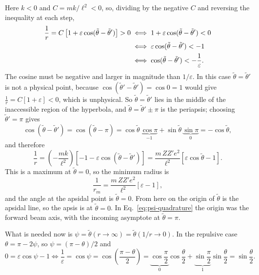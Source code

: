 \documentclass[11pt]{article}
\newcommand{\orbang}{\tilde\theta}
\begin{document}
Here $k<0$ and $C = mk/\ell^{2} < 0$, so, dividing by the negative $C$ and
reversing the inequality at each step,
%
\begin{align}
  \frac{1}{r} = C\left[1 + \varepsilon\cos(\orbang-\orbang')\right] > 0
  &\iff 1 + \varepsilon\cos(\orbang-\orbang') < 0 \notag\\
  &\iff \varepsilon\cos(\orbang-\orbang') < -1 \notag\\
  &\iff \cos(\orbang-\orbang') < -\frac{1}{\varepsilon} .
  \label{eq:repulsive-ineq}
\end{align}
%
The cosine must be negative and larger in magnitude than $1/\varepsilon$. In
this case $\orbang = \orbang'$ is not a physical point, because
$\cos(\orbang'-\orbang') = \cos 0 = 1$ would give
$\frac{1}{r} = C\left[1+\varepsilon\right] < 0$, which is unphysical. So
$\orbang = \orbang'$ lies in the middle of the inaccessible region of the
hyperbola, and $\orbang = \orbang' \pm \pi$ is the periapsis; choosing
$\orbang' = \pi$ gives
%
\begin{equation}\label{eq:cos-shift}
  \cos(\orbang-\orbang') = \cos(\orbang-\pi)
    = \cos\orbang\,\underbrace{\cos\pi}_{-1}
    + \sin\orbang\,\underbrace{\sin\pi}_{0}
    = -\cos\orbang ,
\end{equation}
%
and therefore
%
\begin{equation}\label{eq:repulsive-orbit}
  \frac{1}{r} = \left(-\frac{mk}{\ell^{2}}\right)
                \left[-1 - \varepsilon\cos(\orbang-\orbang')\right]
              = \frac{m\,Z Z' e^{2}}{\ell^{2}}\left[\varepsilon\cos\orbang - 1\right].
\end{equation}
%
This is a maximum at $\orbang = 0$, so the minimum radius is
%
\begin{equation}\label{eq:rmin-repulsive}
  \frac{1}{r_m} = \frac{m\,Z Z' e^{2}}{\ell^{2}}\left[\varepsilon - 1\right],
\end{equation}
%
and the angle at the apsidal point is $\orbang = 0$. From here on the origin of
$\orbang$ is the apsidal line, so the apsis is at $\orbang = 0$. In
Eq.~\eqref{eq:psi-quadrature} the origin was the forward beam axis, with the
incoming asymptote at $\orbang = \pi$.

What is needed now is $\psi = \orbang(r\to\infty) = \orbang(1/r \to 0)$. In the
repulsive case $\theta = \pi - 2\psi$, so $\psi = (\pi-\theta)/2$ and
%
\begin{equation}\label{eq:psi-repulsive}
  0 = \varepsilon\cos\psi - 1
  \iff
  \frac{1}{\varepsilon} = \cos\psi = \cos\!\left(\frac{\pi-\theta}{2}\right)
    = \underbrace{\cos\frac{\pi}{2}}_{0}\cos\frac{\theta}{2}
    + \underbrace{\sin\frac{\pi}{2}}_{1}\sin\frac{\theta}{2}
    = \sin\frac{\theta}{2} .
\end{equation}
\end{document}
